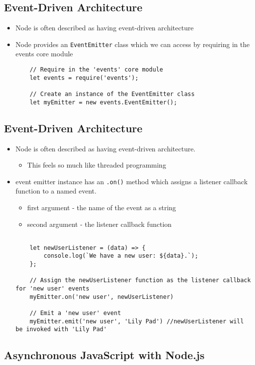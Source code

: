 \documentclass[12pt]{article}
\begin{document}
\subsection{Event-Driven Architecture}
\begin{itemize}
    \item Node is often described as having event-driven architecture
    \item Node provides an \texttt{EventEmitter} class which we can access by requiring in the events core module
    \begin{lstlisting}
    // Require in the 'events' core module
    let events = require('events');

    // Create an instance of the EventEmitter class
    let myEmitter = new events.EventEmitter();
    \end{lstlisting}
\end{itemize}

\subsection{Event-Driven Architecture}
\begin{itemize}
    \item Node is often described as having event-driven architecture.
    \begin{itemize}
        \item This feels so much like threaded programming
    \end{itemize}
    \item event emitter instance has an \texttt{.on()} method which assigns a listener callback function to a named event.
    \begin{itemize}
        \item first argument - the name of the event as a string
        \item second argument - the listener callback function
    \end{itemize}

    \begin{lstlisting}

    let newUserListener = (data) => {
        console.log(`We have a new user: ${data}.`);
    };

    // Assign the newUserListener function as the listener callback for 'new user' events
    myEmitter.on('new user', newUserListener)

    // Emit a 'new user' event
    myEmitter.emit('new user', 'Lily Pad') //newUserListener will be invoked with 'Lily Pad'
    \end{lstlisting}
\end{itemize}

\subsection{Asynchronous JavaScript with Node.js}
\end{document}
